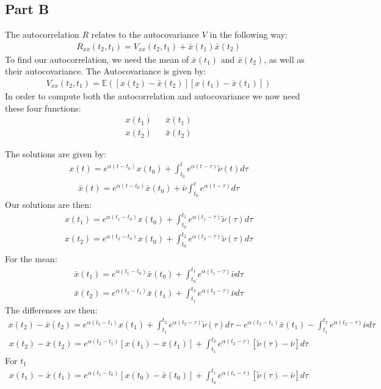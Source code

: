 \documentclass{article}
\begin{document}
\subsection*{Part B}
The autocorrelation $R$ relates to the autocovariance $V$ in the following way:
\begin{align*}
R_{xx}(t_2,t_1) = V_{xx}(t_2,t_1) + \bar{x}(t_1)\bar{x}(t_2)
\end{align*}
To find our autocorrelation, we need the mean of $\bar{x}(t_1)$ and $\bar{x}(t_2)$, as well as their autocovariance.
The Autocovariance is given by:
\begin{align*}
V_{xx}(t_2,t_1) = \mathbb{E}([x(t_2)-\bar{x}(t_2)][x(t_1)-\bar{x}(t_1)])
\end{align*}
In order to compute both the autocorrelation and autocovariance we now need these four functions:
\begin{align*}
x(t_1) && \bar{x}(t_1) \\
x(t_2) && \bar{x}(t_2)
\end{align*}



The solutions are given by:
\begin{align*}
x(t) = e^{\alpha (t-t_0)} x(t_0) + \int_{t_0}^{t} e^{\alpha (t-\tau)} \tilde{\nu}(t) d\tau
\end{align*}
\begin{align*}
\bar{x}(t) = e^{\alpha (t-t_0)}\bar{x}(t_0) + \bar{\nu}\int_{t_0}^{t} e^{\alpha (t-\tau)} d\tau
\end{align*}
Our solutions are then:
\begin{align*}
x(t_1) = e^{\alpha (t_1-t_0)} x(t_0) + \int_{t_0}^{t_1} e^{\alpha (t_1-\tau)} \tilde{\nu}(\tau) d\tau \\
x(t_2) = e^{\alpha (t_2-t_0)} x(t_0) + \int_{t_0}^{t_2} e^{\alpha (t_2-\tau)} \tilde{\nu}(\tau) d\tau \\
\end{align*}
For the mean:
\begin{align*}
\bar{x}(t_1) = e^{\alpha (t_1-t_0)}\bar{x}(t_0) + \int_{t_0}^{t_1} e^{\alpha (t_1-\tau)} \bar{\nu} d\tau \\
\bar{x}(t_2) = e^{\alpha (t_2-t_1)}\bar{x}(t_1) + \int_{t_1}^{t_2} e^{\alpha (t_2-\tau)} \bar{\nu} d\tau
\end{align*}
The differences are then:
\begin{align*}
x(t_2)-\bar{x}(t_2) = e^{\alpha (t_2-t_1)} x(t_1) + \int_{t_1}^{t_2} e^{\alpha (t_2-\tau)} \tilde{\nu}(\tau) d\tau - e^{\alpha (t_2-t_1)}\bar{x}(t_1) - \int_{t_1}^{t_2} e^{\alpha (t_2-\tau)} \bar{\nu} d\tau
\end{align*}
\begin{align*}
x(t_2)-\bar{x}(t_2) = e^{\alpha (t_2-t_1)}[x(t_1) - \bar{x}(t_1)] +  \int_{t_1}^{t_2} e^{\alpha (t_2-\tau)} [\tilde{\nu}(\tau) - \bar{\nu}] d\tau
\end{align*}
For $t_1$
\begin{align*}
x(t_1)-\bar{x}(t_1) = e^{\alpha (t_1-t_0)}[x(t_0) - \bar{x}(t_0)] +  \int_{t_0}^{t_1} e^{\alpha (t_1-\tau)} [\tilde{\nu}(\tau) - \bar{\nu}] d\tau
\end{align*}
\end{document}
